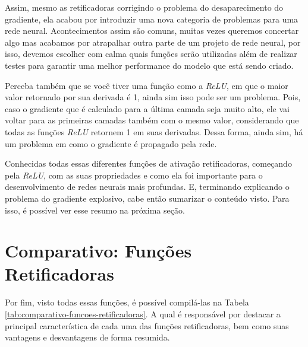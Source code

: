 Assim, mesmo as retificadoras corrigindo o problema do desaparecimento do gradiente, ela acabou por introduzir uma nova categoria de problemas para uma rede neural. Acontecimentos assim são comuns, muitas vezes queremos concertar algo mas acabamos por atrapalhar outra parte de um projeto de rede neural, por isso, devemos escolher com calma quais funções serão utilizadas além de realizar testes para garantir uma melhor performance do modelo que está sendo criado.

Perceba também que se você tiver uma função como a \textit{ReLU}, em que o maior valor retornado por sua derivada é 1, ainda sim isso pode ser um problema. Pois, caso o gradiente que é calculado para a última camada seja muito alto, ele vai voltar para as primeiras camadas também com o mesmo valor, considerando que todas as funções \textit{ReLU} retornem 1 em suas derivadas. Dessa forma, ainda sim, há um problema em como o gradiente é propagado pela rede.

Conhecidas todas essas diferentes funções de ativação retificadoras, começando pela \textit{ReLU}, com as suas propriedades e como ela foi importante para o desenvolvimento de redes neurais mais profundas. E, terminando explicando o problema do gradiente explosivo, cabe então sumarizar o conteúdo visto. Para isso, é possível ver esse resumo na próxima seção.

\section{Comparativo: Funções Retificadoras}

Por fim, visto todas essas funções, é possível compilá-las na Tabela \ref{tab:comparativo-funcoes-retificadoras}. A qual é responsável por destacar a principal característica de cada uma das funções retificadoras, bem como suas vantagens e desvantagens de forma resumida.

